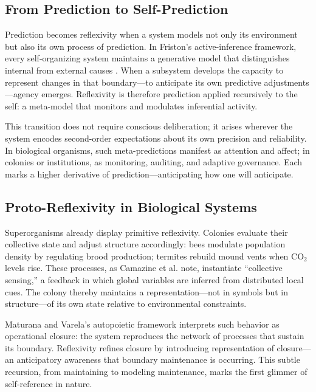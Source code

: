 \documentclass[11pt,a4paper]{article}
\begin{document}
\subsection{From Prediction to Self-Prediction}

Prediction becomes reflexivity when a system models not only its environment but also its own process of prediction.  In Friston’s active-inference framework, every self-organizing system maintains a generative model that distinguishes internal from external causes \citep{Friston2010FreeEnergyPrinciple}.  When a subsystem develops the capacity to represent changes in that boundary—to anticipate its own predictive adjustments—agency emerges.  Reflexivity is therefore prediction applied recursively to the self: a meta-model that monitors and modulates inferential activity.  

This transition does not require conscious deliberation; it arises wherever the system encodes second-order expectations about its own precision and reliability.  In biological organisms, such meta-predictions manifest as attention and affect; in colonies or institutions, as monitoring, auditing, and adaptive governance.  Each marks a higher derivative of prediction—anticipating how one will anticipate.

\subsection{Proto-Reflexivity in Biological Systems}

Superorganisms already display primitive reflexivity.  Colonies evaluate their collective state and adjust structure accordingly: bees modulate population density by regulating brood production; termites rebuild mound vents when CO$_2$ levels rise.  These processes, as Camazine et al. \citep{Camazine2001SelfOrganizationBiologicalSystems} note, instantiate “collective sensing,” a feedback in which global variables are inferred from distributed local cues.  The colony thereby maintains a representation—not in symbols but in structure—of its own state relative to environmental constraints.

Maturana and Varela’s autopoietic framework \citep{MaturanaVarela1980Autopoiesis} interprets such behavior as operational closure: the system reproduces the network of processes that sustain its boundary.  Reflexivity refines closure by introducing representation of closure—an anticipatory awareness that boundary maintenance is occurring.  This subtle recursion, from maintaining to modeling maintenance, marks the first glimmer of self-reference in nature.
\end{document}
